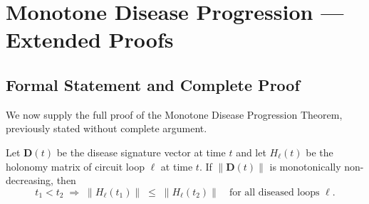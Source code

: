 \section{Monotone Disease Progression --- Extended Proofs}
\label{sec:ch04-monotone-progression-extended}

\subsection{Formal Statement and Complete Proof}

We now supply the full proof of the Monotone Disease Progression Theorem,
previously stated without complete argument.

\begin{theorem}
\label{thm:ch04-monotone-progression}
Let $\mathbf{D}(t)$ be the disease signature vector at time $t$ and let
$H_\ell(t)$ be the holonomy matrix of circuit loop $\ell$ at time $t$.  If
$\|\mathbf{D}(t)\|$ is monotonically non-decreasing, then
\begin{equation}
\label{eq:ch04-monotone-statement}
    t_1 < t_2
    \;\Rightarrow\;
    \|H_\ell(t_1)\| \;\leq\; \|H_\ell(t_2)\|
    \quad \text{for all diseased loops } \ell.
\end{equation}
\end{theorem}


